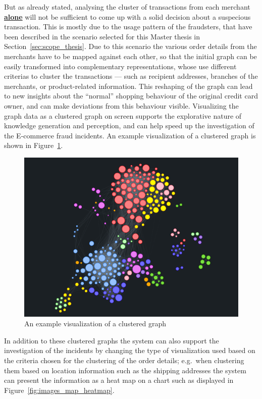 But as already stated, analysing the cluster of transactions from each merchant \textbf{\underline{alone}} will not be sufficient to come up with a solid decision about a suspecious transaction. This is mostly due to the usage pattern of the fraudsters, that have been described in the scenario selected for this Master thesis in Section~\ref{sec:scope_thesis}. Due to this scenario the various order details from the merchants have to be mapped against each other, so that the initial graph can be easily transformed into complementary representations, whose use different criterias to cluster the transactions --- such as recipient addresses, branches of the merchants, or product-related information. This reshaping of the graph can lead to new insights about the ``normal'' shopping behaviour of the original credit card owner, and can make deviations from this behaviour visible. Visualizing the graph data as a clustered graph on screen supports the explorative nature of knowledge generation and perception, and can help speed up the investigation of the \gls{E-commerce} fraud incidents. An example visualization of a clustered graph is shown in Figure~\ref{fig:images_graph_viz}. \\

\begin{figure}[!ht]
  \centering
  \includegraphics[width=0.9\columnwidth]{images/GraphViz.png}
  \caption{An example visualization of a clustered graph \citep{visjsshowcase}}
\label{fig:images_graph_viz}
\end{figure}

 In addition to these clustered graphs the system can also support the investigation of the incidents by changing the type of visualization used based on the criteria chosen for the clustering of the order details; e.g.\ when clustering them based on location information such as the shipping addresses the system can present the information as a heat map on a chart such as displayed in Figure~\ref{fig:images_map_heatmap}. \@

